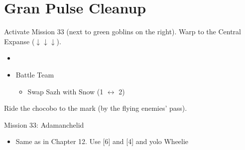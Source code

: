 \chapter{Gran Pulse Cleanup}

Activate Mission 33 (next to green goblins on the right).
Warp to the Central Expanse ($\downarrow\downarrow\downarrow$).

\begin{menu}
	\begin{itemize}
	\paradigm
		\begin{itemize}
			\item {}%
				{\paradigmline{\com}{(\com)}{\com}}%
				{\paradigmline{\com}{(\com)}{\sab}}%
				{\paradigmline{(\com)}{\sen}{(\med)}}%
				{\paradigmline{(\syn)}{(\rav)}{(\sab)}}%
				{\paradigmline{\syn}{\sen}{\med}}%
				{\paradigmline[4]{(\rav)}{\rav}{\sab}}%
			\item Battle Team
				\begin{itemize}
					\item Swap Sazh with Snow (1 $\leftrightarrow$ 2)
				\end{itemize}
		\end{itemize}
	\end{itemize}
\end{menu}

\renewcommand{\first}{[1] Cerberus (\com/\com/\com)}
\renewcommand{\second}{[2] Devastation (\com/\com/\sab)}
\renewcommand{\third}{[3] Solidarity (\com/\sen/\med)}
\renewcommand{\fourth}{[4] Guerilla (\syn/\rav/\sab)}
\renewcommand{\fifth}{[5] Protection (\syn/\sen/\med)}
\renewcommand{\sixth}{[6] Smart Bomb (\rav/\rav/\sab)}

Ride the chocobo to the mark (by the flying enemies' pass).

\begin{battle}{Mission 33: Adamanchelid}
	\begin{itemize}
		\item Same as in Chapter 12. Use [6] and [4] and yolo Wheelie
	\end{itemize}
\end{battle}

